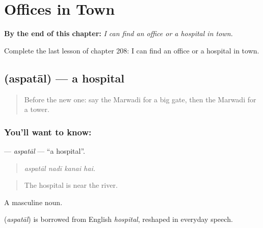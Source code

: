
\chapter{Offices in Town}
\label{ch:mw-offices-in-town}

\begin{chapteropening}
\textbf{By the end of this chapter:} \emph{I can find an office or a hospital in town.}

Complete the last lesson of chapter 208: I can find an office or a hospital in town.
\end{chapteropening}

\section[\texorpdfstring{\mw{अस्पताल} (aspatāl)}{अस्पताल (aspatāl)}]{ (aspatāl) — a hospital}

\label{lesson:MW-C208-aspatal}



\begin{quote}
Before the new one: say the Marwadi for a big gate, then the Marwadi for a tower.
\end{quote}

\subsection*{You'll want to know: }
\textbf{} — \emph{aspatāl} — \textquotedblleft{}a hospital\textquotedblright{}.

\begin{quote}
   
\end{quote}

\begin{quote}
\emph{aspatāl nadī kanai hai.}
\end{quote}

\begin{quote}
The hospital is near the river.
\end{quote}

A masculine noun.

\begin{cousinweb}
\textbf{} (\emph{aspatāl}) is borrowed from English \emph{hospital}, reshaped in everyday speech.
\end{cousinweb}

